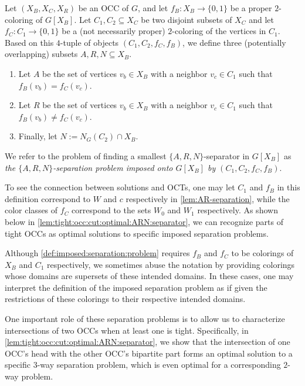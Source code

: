 \begin{definition} \label{def:imposed:separation:problem}
	Let $(X_B, X_C, X_R)$ be an OCC of $G$, and let $f_B \colon X_B \rightarrow \{0, 1\}$ be a proper $2$-coloring of $G[X_B]$. Let $C_1, C_2 \subseteq X_C$ be two disjoint subsets of $X_C$ and let $f_{C} \colon C_1 \rightarrow \{0, 1\}$ be a (not necessarily proper) $2$-coloring of the vertices in $C_1$. Based on this $4$-tuple of objects $(C_1, C_2, f_C, f_B)$, we define three (potentially overlapping) subsets $A, R, N \subseteq X_B$.
  	\begin{enumerate}
		\item Let $A$ be the set of vertices $v_b \in X_B$ with a neighbor $v_c \in C_1$ such that $f_B(v_b) = f_C(v_c)$.
		\item Let $R$ be the set of vertices $v_b \in X_B$ with a neighbor $v_c \in C_1$ such that $f_B(v_b) \neq f_C(v_c)$.
		\item Finally, let $N := N_G(C_2) \cap X_B$.
	\end{enumerate} 
	We refer to the problem of finding a smallest $\{A, R, N\}$-separator in $G[X_B]$ as \emph{the $\{A, R, N\}$-separation problem imposed onto $G[X_B]$ by $(C_1, C_2, f_C, f_B)$}.
\end{definition}

To see the connection between solutions and OCTs, one may let $C_1$ and $f_B$ in this definition correspond to $W$ and $c$ respectively in \cref{lem:AR-separation}, while the color classes of $f_C$ correspond to the sets $W_0$ and $W_1$ respectively. As shown below in \cref{lem:tight:occ:cut:optimal:ARN:separator}, we can recognize parts of tight OCCs as optimal solutions to specific imposed separation problems.

Although \cref{def:imposed:separation:problem} requires $f_B$ and $f_C$ to be colorings of $X_B$ and $C_1$ respectively, we sometimes abuse the notation by providing colorings whose domains are supersets of these intended domains. In these cases, one may interpret the definition of the imposed separation problem as if given the restrictions of these colorings to their respective intended domains.

One important role of these separation problems is to allow us to characterize intersections of two OCCs when at least one is tight. Specifically, in \cref{lem:tight:occ:cut:optimal:ARN:separator}, we show that the intersection of one OCC's head with the other OCC's bipartite part forms an optimal solution to a specific $3$-way separation problem, which is even optimal for a corresponding $2$-way problem.

